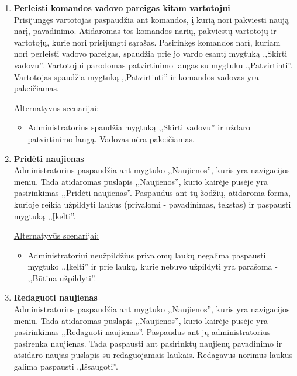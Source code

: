 \documentclass{VUMIFPSkursinis}
\begin{document}
\begin{enumerate} [label = \textbf{U\arabic*.}]
					\underline{Alternatyvūs scenarijai:}
					\begin{itemize}
						\item Jei vartotojas palieka teksto lauką tuščią, mygtukas ,,Kviesti'' yra neaktyvus.
						\item Jei įvedamas neegzistuojantis vardas, metama klaida.
					\end{itemize}
				
			\item \textbf{Perleisti komandos vadovo pareigas kitam vartotojui}   \\
					Prisijungęs vartotojas paspaudžia ant komandos, į kurią nori pakviesti naują narį, pavadinimo. Atidaromas tos komandos narių, pakviestų vartotojų ir vartotojų, kurie nori prisijungti sąrašas. Pasirinkęs komandos narį, kuriam nori perleisti vadovo pareigas, spaudžia prie jo vardo esantį mygtuką ,,Skirti vadovu''. Vartotojui parodomas patvirtinimo langas su mygtuku ,,Patvirtinti''. Vartotojas spaudžia mygtuką ,,Patvirtinti'' ir komandos vadovas yra pakeičiamas.
					
					\underline{Alternatyvūs scenarijai:}
					\begin{itemize}
						\item Administratorius spaudžia mygtuką ,,Skirti vadovu'' ir uždaro patvirtinimo langą. Vadovas nėra pakeičiamas.
					\end{itemize}
				
			\item \textbf{Pridėti naujienas}   \\
					Administratorius paspaudžia ant mygtuko ,,Naujienos'', kuris yra navigacijos meniu. Tada atidaromas puslapis ,,Naujienos'', kurio kairėje pusėje yra pasirinkimas ,,Pridėti naujienas''. Paspaudus ant tų žodžių, atidaroma forma, kurioje reikia užpildyti laukus (privalomi - pavadinimas, tekstas) ir paspausti mygtuką ,,Įkelti''.
					
					\underline{Alternatyvūs scenarijai:}
					\begin{itemize}
						\item Administratoriui neužpildžius privalomų laukų negalima paspausti mygtuko ,,Įkelti'' ir prie laukų, kurie nebuvo užpildyti yra parašoma - ,,Būtina užpildyti''.
					\end{itemize}
			
			\item \textbf{Redaguoti naujienas}   \\
					Administratorius paspaudžia  ant mygtuko ,,Naujienos'', kuris yra navigacijos meniu. Tada atidaromas puslapis ,,Naujienos'', kurio kairėje pusėje yra pasirinkimas ,,Redaguoti naujienas''. Paspaudus ant jų administratorius pasirenka naujienas. Tada paspausti ant pasirinktų naujienų pavadinimo ir atsidaro naujas puslapis su redaguojamais laukais. Redagavus norimus laukus galima paspausti ,,Išsaugoti''.
					

\end{enumerate}
\end{document}
